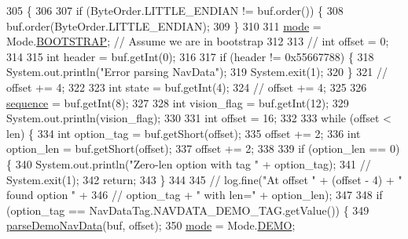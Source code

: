 \begin{DoxyCode}
305                                                                \{
306 
307         \textcolor{keywordflow}{if} (ByteOrder.LITTLE\_ENDIAN != buf.order()) \{
308             buf.order(ByteOrder.LITTLE\_ENDIAN);
309         \}
310 
311         \hyperlink{classworkspace_1_1_a_r_drone_nav_data_1_1src_1_1_nav_data_a60cc1aab4d441d6d3467bfa777c85783}{mode} = Mode.\hyperlink{enumworkspace_1_1_a_r_drone_nav_data_1_1src_1_1controller_1_1_mode_a2120c5fbe7850731f0921fa1523a0f67}{BOOTSTRAP}; \textcolor{comment}{// Assume we are in bootstrap}
312 
313         \textcolor{comment}{// int offset = 0;}
314 
315         \textcolor{keywordtype}{int} header = buf.getInt(0);
316 
317         \textcolor{keywordflow}{if} (header != 0x55667788) \{
318             System.out.println(\textcolor{stringliteral}{"Error parsing NavData"});
319             System.exit(1);
320         \}
321         \textcolor{comment}{// offset += 4;}
322 
323         \textcolor{keywordtype}{int} state = buf.getInt(4);
324         \textcolor{comment}{// offset += 4;}
325 
326         \hyperlink{classworkspace_1_1_a_r_drone_nav_data_1_1src_1_1_nav_data_aa257d1d766978c405e0d98aacb437817}{sequence} = buf.getInt(8);
327 
328         \textcolor{keywordtype}{int} vision\_flag = buf.getInt(12);
329         System.out.println(vision\_flag);
330 
331         \textcolor{keywordtype}{int} offset = 16;
332 
333         \textcolor{keywordflow}{while} (offset < len) \{
334             \textcolor{keywordtype}{int} option\_tag = buf.getShort(offset);
335             offset += 2;
336             \textcolor{keywordtype}{int} option\_len = buf.getShort(offset);
337             offset += 2;
338 
339             \textcolor{keywordflow}{if} (option\_len == 0) \{
340                 System.out.println(\textcolor{stringliteral}{"Zero-len option with tag "} + option\_tag);
341                 \textcolor{comment}{// System.exit(1);}
342                 \textcolor{keywordflow}{return};
343             \}
344 
345             \textcolor{comment}{// log.fine("At offset " + (offset - 4) + " found option " +}
346             \textcolor{comment}{// option\_tag + " with len=" + option\_len);}
347 
348             \textcolor{keywordflow}{if} (option\_tag == NavDataTag.NAVDATA\_DEMO\_TAG.getValue()) \{
349                 \hyperlink{classworkspace_1_1_a_r_drone_nav_data_1_1src_1_1_nav_data_a5bf3b738d8cfc76f9e52de7d13c613cf}{parseDemoNavData}(buf, offset);
350                 \hyperlink{classworkspace_1_1_a_r_drone_nav_data_1_1src_1_1_nav_data_a60cc1aab4d441d6d3467bfa777c85783}{mode} = Mode.\hyperlink{enumworkspace_1_1_a_r_drone_nav_data_1_1src_1_1controller_1_1_mode_a09071332c54725b55b8f88c41ec504d1}{DEMO};

\end{DoxyCode}
